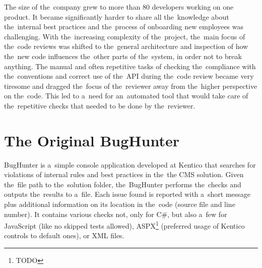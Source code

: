 \documentclass[
  digital, %
  table,   %
  lof,     %
  lot,     %
  oneside,
]{fithesis3}
\begin{document}
The size of the~company grew to more than 80 developers working on one product. It became significantly harder to share all the~knowledge about the~internal best practices and the~process of onboarding new employees was challenging. With the~increasing complexity of the~project, the~main focus of the~code reviews was shifted to the~general architecture and inspection of how the~new code influences the~other parts of the~system, in order not to break anything. The manual and often repetitive tasks of checking the~compliance with the~conventions and correct use of the~API during the~code review became very tiresome and dragged the~focus of the~reviewer away from the~higher perspective on the~code. This led to a~need for an~automated tool that would take care of the~repetitive checks that needed to be done by the~reviewer.




\section{The Original BugHunter}
BugHunter is a~simple console application developed at Kentico that searches for violations of internal rules and best practices in the~the CMS solution. Given the~file path to the~solution folder, the~BugHunter performs the~checks and outputs the~results to a~file. Each issue found is reported with a~short message plus additional information on its location in the~code (source file and line number). It contains various checks not, only for C\#, but also a~few for JavaScript (like no skipped tests allowed), ASPX\footnote{TODO} (preferred usage of Kentico controls to default ones), or XML files.
\end{document}
